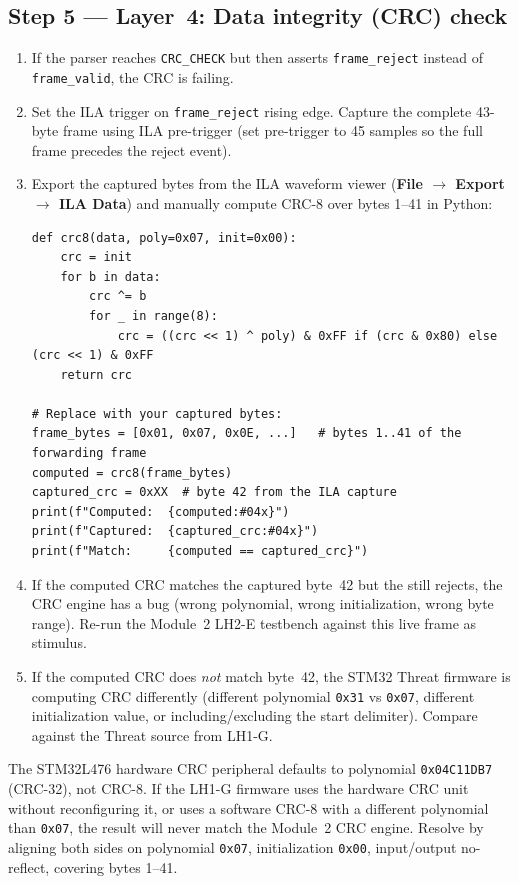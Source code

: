 \documentclass[11pt,letterpaper]{article}
\begin{document}
\subsection{Step 5 --- Layer~4: Data integrity (CRC) check}
\begin{enumerate}[leftmargin=2em]
	\item If the parser reaches \texttt{CRC\_CHECK} but then asserts \texttt{frame\_reject} instead of \texttt{frame\_valid}, the \mbox{CRC} is failing.
	\item Set the \mbox{ILA} trigger on \texttt{frame\_reject} rising edge. Capture the complete 43-byte frame using \mbox{ILA} pre-trigger (set pre-trigger to 45 samples so the full frame precedes the reject event).
	\item Export the captured bytes from the \mbox{ILA} waveform viewer (\textbf{File $\to$ Export $\to$ ILA Data}) and manually compute \mbox{CRC}-8 over bytes 1--41 in Python:
	\begin{verbatim}
def crc8(data, poly=0x07, init=0x00):
    crc = init
    for b in data:
        crc ^= b
        for _ in range(8):
            crc = ((crc << 1) ^ poly) & 0xFF if (crc & 0x80) else (crc << 1) & 0xFF
    return crc

# Replace with your captured bytes:
frame_bytes = [0x01, 0x07, 0x0E, ...]   # bytes 1..41 of the forwarding frame
computed = crc8(frame_bytes)
captured_crc = 0xXX  # byte 42 from the ILA capture
print(f"Computed:  {computed:#04x}")
print(f"Captured:  {captured_crc:#04x}")
print(f"Match:     {computed == captured_crc}")
	\end{verbatim}
	\item If the computed \mbox{CRC} matches the captured byte~42 but the \FPGA{} still rejects, the \VHDL{} \mbox{CRC} engine has a bug (wrong polynomial, wrong initialization, wrong byte range). Re-run the Module~2 LH2-E testbench against this live frame as stimulus.
	\item If the computed \mbox{CRC} does \emph{not} match byte~42, the STM32 Threat firmware is computing \mbox{CRC} differently (different polynomial \texttt{0x31} vs \texttt{0x07}, different initialization value, or including/excluding the start delimiter). Compare against the Threat source from LH1-G.
\end{enumerate}

\begin{tcolorbox}[warning={CRC Polynomial Mismatch is the Most Common Layer-4 Failure}]
	The STM32L476 hardware \mbox{CRC} peripheral defaults to polynomial \texttt{0x04C11DB7} (CRC-32), not \mbox{CRC}-8. If the LH1-G firmware uses the hardware \mbox{CRC} unit without reconfiguring it, or uses a software \mbox{CRC}-8 with a different polynomial than \texttt{0x07}, the result will never match the Module~2 \VHDL{} \mbox{CRC} engine. Resolve by aligning both sides on polynomial \texttt{0x07}, initialization \texttt{0x00}, input/output no-reflect, covering bytes 1--41.
\end{tcolorbox}
\end{document}
